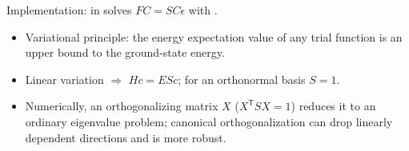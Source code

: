 Implementation:  in  solves $F C = S C \epsilon$ with .

\begin{summary}
\begin{itemize}
  \item Variational principle: the energy expectation value of any trial function is an upper bound to the ground-state energy.
  \item Linear variation $\Rightarrow$ $H c = E S c$; for an orthonormal basis $S = 1$.
  \item Numerically, an orthogonalizing matrix $X$ ($X^{\mathsf T} S X = 1$) reduces it to an ordinary eigenvalue problem; canonical orthogonalization can drop linearly dependent directions and is more robust.
\end{itemize}
\end{summary}
